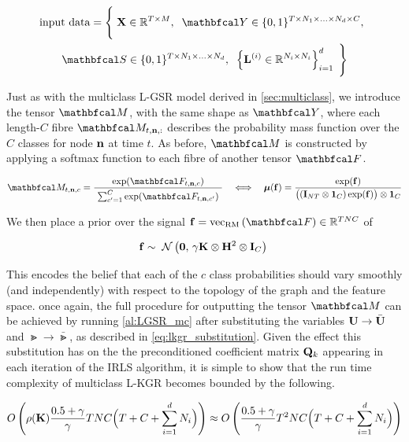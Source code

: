 \begin{multline*}
    \text{input data} = \Bigg\{\;\X \in \R^{T \times M}, \;\; \Yt \in \{0, 1\}^{T \times N_1 \times ... \times N_d \times C}, \;\; \\ 
    \St \in \{0, 1\}^{T \times N_1 \times ... \times N_d} , \;\; \left\{\LL^{(i)} \in \R^{N_i \times N_i}\right\}_{i=1}^d \; \Bigg\}
\end{multline*}

Just as with the multiclass L-GSR model derived in \cref{sec:multiclass}, we introduce the tensor $\Mt$, with the same shape as $\Yt$, where each length-$C$ fibre $\Mt_{t, \nn, :}$ describes the probability mass function over the $C$ classes for node $\mathbf{n}$ at time $t$. As before, $\Mt$ is constructed by applying a softmax function to each fibre of another tensor $\Ft$. 

\begin{equation}
    \label{eq:softmax2}
    \Mt_{t, \nn, c} = \frac{\exp(\Ft_{t, \nn, c})}{ \raisebox{-0.1cm} { $\sum_{c'=1}^C \exp(\Ft_{t, \nn, c'})$ }}  \quad \Longleftrightarrow \quad \muu(\f) = \frac{\exp(\f)}{ \big((\I_{NT} \otimes \one_C) \exp(\f)\big) \otimes \one_C}
\end{equation}

We then place a prior over the signal $\f = \vecrm{\Ft} \in \R^{TNC}$ of

\begin{equation}
    \mathbf{f} \sim \; \mathcal{N}\left(\mathbf{0}, \, \gamma \mathbf{K} \otimes \mathbf{H}^2 \otimes \mathbf{I}_C\right) \;
\end{equation}

This encodes the belief that each of the $c$ class probabilities should vary smoothly (and independently) with respect to the topology of the graph and the feature space. once again, the full procedure for outputting the tensor $\Mt$ can be achieved by running \cref{al:LGSR_mc} after substituting the variables $\mathbf{U} \rightarrow \bar{\mathbf{U}}$ and $\Gt \rightarrow \bar{\Gt}$, as described in \cref{eq:lkgr_substitution}. Given the effect this substitution has on the the preconditioned coefficient matrix $\mathbf{Q}_k$ appearing in each iteration of the IRLS algorithm, it is simple to show that the run time complexity of multiclass L-KGR becomes bounded by the following. 

\begin{equation*}
    O\left(\rho(\mathbf{K}) \frac{0.5 + \gamma}{\gamma} TNC \Big(T + C + \sum_{i=1}^d N_i \Big)\right) \approx O\left(\frac{0.5 + \gamma}{\gamma} T^2NC \Big(T + C + \sum_{i=1}^d N_i \Big)\right)
\end{equation*}


